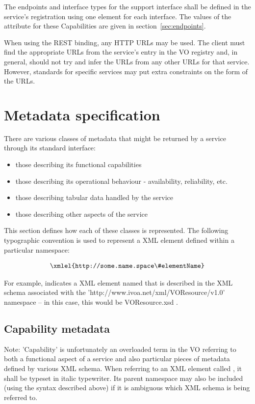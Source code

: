 \documentclass[11pt,letter]{ivoa}
\begin{document}
The endpoints and interface types for the support interface shall be defined in the service's registration using one  element for each interface. The values of the  attribute for these Capabilities are given in section~\ref{sec:endpoints}.

When using the REST binding, any HTTP URLs may be used. The client must find the appropriate URLs from the service's entry in the VO registry and, in general, should not try and infer the URLs from any other URLs for that service. However, standards for specific services may put extra constraints on the form of the URLs.

\section{Metadata specification}
\label{sec:metadata}

 There are various classes of metadata that might be returned by a service through its standard interface:

\begin{itemize}
\item those describing its functional capabilities
\item those describing its operational behaviour - availability, reliability, etc.
\item those describing tabular data handled by the service
\item those describing other aspects of the service 
\end{itemize}

This section defines how each of these classes is represented. The following typographic convention is used to represent a XML element defined within a particular namespace:

$$\hbox{\xmlel{http://some.name.space\#elementName}}$$

For example,  indicates a XML element named  that is described in the XML schema associated with the 'http://www.ivoa.net/xml/VOResource/v1.0' namespace -- in this case, this would be VOResource.xsd \citep{std:VOR}. 

\subsection{Capability metadata}

Note:
    'Capability' is unfortunately an overloaded term in the VO referring to both a functional aspect of a service and also particular pieces of metadata defined by various XML schema. When referring to an XML element called , it shall be typeset in italic typewriter. Its parent namespace may also be included (using the syntax described above) if it is ambiguous which XML schema is being referred to. 
    
\end{document}
